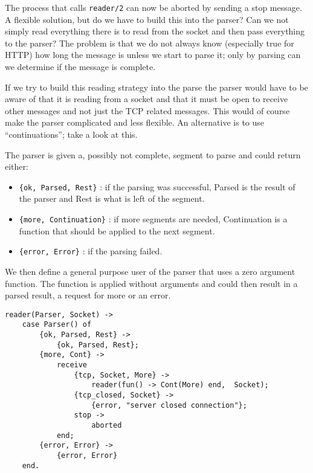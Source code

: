 \documentclass[a4paper,11pt]{article}
\begin{document}
The process that calls {\tt reader/2} can now be aborted by sending a
stop message. A flexible solution, but do we have to build this into
the parser? Can we not simply read everything there is to read from
the socket and then pass everything to the parser? The problem is that
we do not always know (especially true for HTTP) how long the message
is unless we start to parse it; only by parsing can we determine if the
message is complete.

If we try to build this reading strategy into the parse the parser
would have to be aware of that it is reading from a socket and that it
must be open to receive other messages and not just the TCP related
messages. This would of course make the parser complicated and less
flexible. An alternative is to use ``continuations''; take a look at this.

The parser is given a, possibly not complete, segment to parse and
could return either:

\begin{itemize}

 \item {\tt \{ok, Parsed, Rest\}} : if the parsing was successful,
   Parsed is the result of the parser and Rest is what is left of the
   segment.

 \item {\tt \{more, Continuation\}} : if more segments are needed,
   Continuation is a function that should be applied to the next segment.

 \item {\tt \{error, Error\}} : if the parsing failed.

\end{itemize}

We then define a general purpose user of the parser that uses a zero
argument function. The function is applied without arguments and
could then result in a parsed result, a request for more or an error. 

\begin{verbatim}
reader(Parser, Socket) ->
    case Parser() of
        {ok, Parsed, Rest} ->
            {ok, Parsed, Rest};
        {more, Cont} ->
            receive
                {tcp, Socket, More} ->
                    reader(fun() -> Cont(More) end,  Socket);
                {tcp_closed, Socket} ->
                    {error, "server closed connection"};
                stop ->
                    aborted
            end;
        {error, Error} ->
            {error, Error}
    end.
\end{verbatim}
\end{document}
